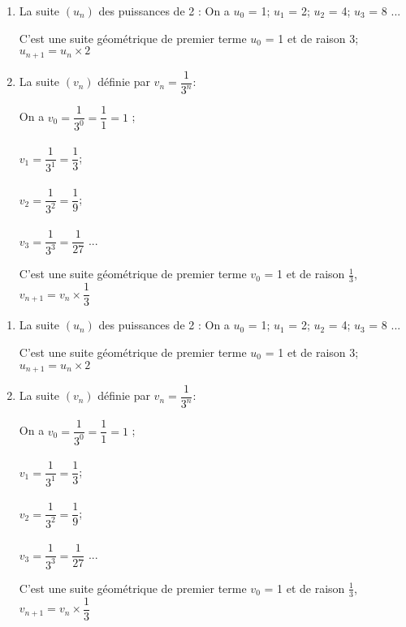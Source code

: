 \documentclass[12pt,a4paper]{article}
\begin{document}
\begin{myex}
	\begin{enumerate}
		\item La suite $(u_n)$ des puissances de 2 :
		On a $u_0$ = 1; $u_1$ = 2; $u_2$ = 4; $u_3$ = 8 ...
		
		C'est une suite géométrique de premier terme $u_0$ = 1 et de raison 3; \\ $u_{n+1} = u_n \times 2 $
		
		\item La suite $(v_n)$ définie par $v_n = \dfrac{1}{3^n}$: 
		
		\begin{multicols}{2}
			On a $v_0 = \dfrac{1}{3^0}  = \dfrac{1}{1} = 1$ ; \\ \\
			$v_1 = \dfrac{1}{3^1} = \dfrac{1}{3}$; \\ \\
			$v_2 = \dfrac{1}{3^2} = \dfrac{1}{9}$; \\ \\
			$v_3 = \dfrac{1}{3^3} = \dfrac{1}{27}$ ...
		\end{multicols}
		
		C'est une suite géométrique de premier terme $v_0$ = 1 et de raison $\frac{1}{3}$,\\ $v_{n+1} = v_n \times \dfrac{1}{3} $
	\end{enumerate}
\end{myex}	

\begin{myex}
	\begin{enumerate}
		\item La suite $(u_n)$ des puissances de 2 :
		On a $u_0$ = 1; $u_1$ = 2; $u_2$ = 4; $u_3$ = 8 ...
		
		C'est une suite géométrique de premier terme $u_0$ = 1 et de raison 3; \\ $u_{n+1} = u_n \times 2 $
		
		\item La suite $(v_n)$ définie par $v_n = \dfrac{1}{3^n}$: 
		
		\begin{multicols}{2}
			On a $v_0 = \dfrac{1}{3^0}  = \dfrac{1}{1} = 1$ ; \\ \\
			$v_1 = \dfrac{1}{3^1} = \dfrac{1}{3}$; \\ \\
			$v_2 = \dfrac{1}{3^2} = \dfrac{1}{9}$; \\ \\
			$v_3 = \dfrac{1}{3^3} = \dfrac{1}{27}$ ...
		\end{multicols}
		
		C'est une suite géométrique de premier terme $v_0$ = 1 et de raison $\frac{1}{3}$,\\ $v_{n+1} = v_n \times \dfrac{1}{3} $
	\end{enumerate}
\end{myex}	
	
\end{document}
